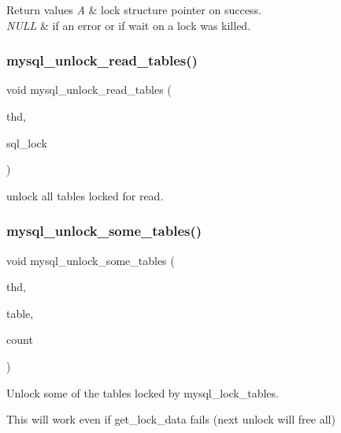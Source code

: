 \begin{DoxyRetVals}{Return values}
{\em A} & lock structure pointer on success. \\
\hline
{\em N\+U\+LL} & if an error or if wait on a lock was killed. \\
\hline
\end{DoxyRetVals}
\mbox{\label{group__Locking_ga1e24a131cbe030c49d953669f804877d}} 
\subsubsection{\texorpdfstring{mysql\+\_\+unlock\+\_\+read\+\_\+tables()}{mysql\_unlock\_read\_tables()}}
{\footnotesize\ttfamily void mysql\+\_\+unlock\+\_\+read\+\_\+tables (\begin{DoxyParamCaption}\item[{T\+HD $\ast$}]{thd,  }\item[{\mbox{\hyperlink{structst__mysql__lock}{M\+Y\+S\+Q\+L\+\_\+\+L\+O\+CK}} $\ast$}]{sql\+\_\+lock }\end{DoxyParamCaption})}

unlock all tables locked for read. \mbox{\label{group__Locking_gafad092ec9a399db99abd75b57a9ee679}} 
\subsubsection{\texorpdfstring{mysql\+\_\+unlock\+\_\+some\+\_\+tables()}{mysql\_unlock\_some\_tables()}}
{\footnotesize\ttfamily void mysql\+\_\+unlock\+\_\+some\+\_\+tables (\begin{DoxyParamCaption}\item[{T\+HD $\ast$}]{thd,  }\item[{\mbox{\hyperlink{structTABLE}{T\+A\+B\+LE}} $\ast$$\ast$}]{table,  }\item[{uint}]{count }\end{DoxyParamCaption})}

Unlock some of the tables locked by mysql\+\_\+lock\+\_\+tables.

This will work even if get\+\_\+lock\+\_\+data fails (next unlock will free all) 